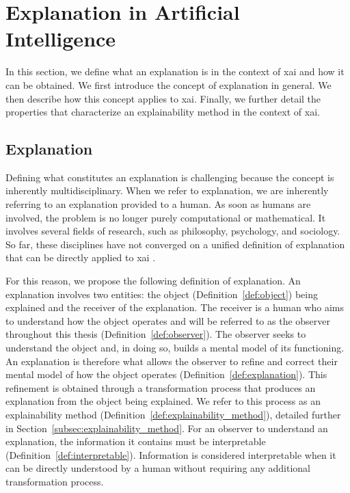 \section{Explanation in Artificial Intelligence}
\label{sec:explanation}

In this section, we define what an explanation is in the context of \gls{xai} and how it can be obtained.
We first introduce the concept of explanation in general.
We then describe how this concept applies to \gls{xai}.
Finally, we further detail the properties that characterize an explainability method in the context of \gls{xai}.

\subsection{Explanation}
\label{subsec:explanation}
Defining what constitutes an explanation is challenging because the concept is inherently multidisciplinary.
When we refer to explanation, we are inherently referring to an explanation provided to a human.
As soon as humans are involved, the problem is no longer purely computational or mathematical.
It involves several fields of research, such as philosophy, psychology, and sociology.
So far, these disciplines have not converged on a unified definition of explanation that can be directly applied to \gls{xai} \parencite{miller2019explanation, bellucci2021towards}.

For this reason, we propose the following definition of explanation.
An explanation involves two entities: the object (Definition~\ref{def:object}) being explained and the receiver of the explanation.
The receiver is a human who aims to understand how the object operates and will be referred to as the observer throughout this thesis (Definition~\ref{def:observer}).
The observer seeks to understand the object and, in doing so, builds a mental model of its functioning.
An explanation is therefore what allows the observer to refine and correct their mental model of how the object operates (Definition~\ref{def:explanation}).
This refinement is obtained through a transformation process that produces an explanation from the object being explained.
We refer to this process as an explainability method (Definition~\ref{def:explainability_method}), detailed further in Section~\ref{subsec:explainability_method}.
For an observer to understand an explanation, the information it contains must be interpretable (Definition~\ref{def:interpretable}).
Information is considered interpretable when it can be directly understood by a human without requiring any additional transformation process.

